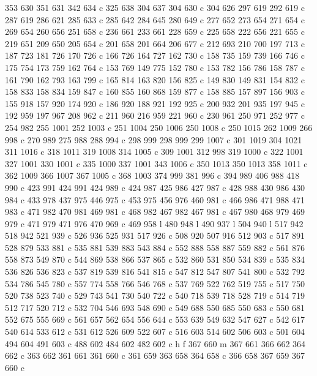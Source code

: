 {{   353 630 351 631 342 634 c
   325 638 304 637 304 630 c
   304 626 297 619 292 619 c
   287 619 286 621 285 633 c
   285 642 284 645 280 649 c
   277 652 273 654 271 654 c
   269 654 260 656 251 658 c
   236 661 233 661 228 659 c
   225 658 222 656 221 655 c
   219 651 209 650 205 654 c
   201 658 201 664 206 677 c
   212 693 210 700 197 713 c
   187 723 181 726 170 726 c
   166 726 164 727 162 730 c
   158 735 159 739 166 746 c
   175 754 173 759 162 764 c
   153 769 149 775 152 780 c
   153 782 156 786 158 787 c
   161 790 162 793 163 799 c
   165 814 163 820 156 825 c
   149 830 149 831 154 832 c
   158 833 158 834 159 847 c
   160 855 160 868 159 877 c
   158 885 157 897 156 903 c
   155 918 157 920 174 920 c
   186 920 188 921 192 925 c
   200 932 201 935 197 945 c
   192 959 197 967 208 962 c
   211 960 216 959 221 960 c
   230 961 250 971 252 977 c
   254 982 255 1001 252 1003 c
   251 1004 250 1006 250 1008 c
   250 1015 262 1009 266 998 c
   270 989 275 988 288 994 c
   298 999 298 999 299 1007 c
   301 1019 304 1021 311 1016 c
   318 1011 319 1008 314 1005 c
   309 1001 312 998 319 1000 c
   322 1001 327 1001 330 1001 c
   335 1000 337 1001 343 1006 c
   350 1013 350 1013 358 1011 c
   362 1009 366 1007 367 1005 c
   368 1003 374 999 381 996 c
   394 989 406 988 418 990 c
   423 991 424 991 424 989 c
   424 987 425 986 427 987 c
   428 988 430 986 430 984 c
   433 978 437 975 446 975 c
   453 975 456 976 460 981 c
   466 986 471 988 471 983 c
   471 982 470 981 469 981 c
   468 982 467 982 467 981 c
   467 980 468 979 469 979 c
   471 979 471 976 470 969 c
   469 958 l
   480 948 l
   490 937 l
   504 940 l
   517 942 518 942 521 939 c
   526 936 525 931 517 926 c
   508 920 507 916 512 903 c
   517 891 528 879 533 881 c
   535 881 539 883 543 884 c
   552 888 558 887 559 882 c
   561 876 558 873 549 870 c
   544 869 538 866 537 865 c
   532 860 531 850 534 839 c
   535 834 536 826 536 823 c
   537 819 539 816 541 815 c
   547 812 547 807 541 800 c
   532 792 534 786 545 780 c
   557 774 558 766 546 768 c
   537 769 522 762 519 755 c
   517 750 520 738 523 740 c
   529 743 541 730 540 722 c
   540 718 539 718 528 719 c
   514 719 512 717 520 712 c
   532 704 546 693 548 690 c
   549 688 550 685 550 683 c
   550 681 552 675 555 669 c
   561 657 562 654 556 644 c
   553 639 549 632 547 627 c
   542 617 540 614 533 612 c
   531 612 526 609 522 607 c
   516 603 514 602 506 603 c
   501 604 494 604 491 603 c
   488 602 484 602 482 602 c
   h f
   367 660 m
   367 661 366 662 364 662 c
   363 662 361 661 361 660 c
   361 659 363 658 364 658 c
   366 658 367 659 367 660 c
}}
